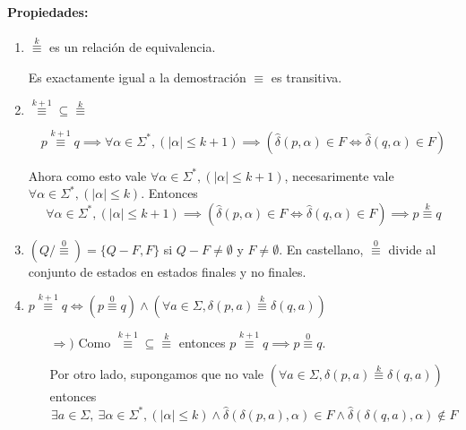 \paragraph{Propiedades:}
\begin{enumerate}
  \item \(\overset{k}{\equiv}\) es un relación de equivalencia.
        \begin{demo}[0.8\textwidth]
          Es exactamente igual a la demostración \(\equiv\) es transitiva.
        \end{demo}
  \item \(\overset{k+1}{\equiv}\subseteq\overset{k}{\equiv}\)
        \begin{demo}[0.8\textwidth]
          \[ p \overset{k+1}{\equiv} q \implies \forall \alpha\in\Sigma^*, (|\alpha|\leq k+1) \implies (\hat\delta(p,\alpha) \in F \iff \hat\delta(q,\alpha) \in F)\]

          Ahora como esto vale \(\forall \alpha\in\Sigma^*, (|\alpha|\leq k+1)\), necesarimente vale \(\forall \alpha\in\Sigma^*, (|\alpha|\leq k)\). Entonces
          \[ \forall \alpha\in\Sigma^*, (|\alpha|\leq k+1) \implies (\hat\delta(p,\alpha) \in F \iff \hat\delta(q,\alpha) \in F) \implies p \overset{k}{\equiv} q\]
        \end{demo}
  \item \(\left(Q / \overset{0}{\equiv}\right) = \{Q-F, F\}\) si \(Q - F \neq \emptyset\) y \(F \neq\emptyset\). En castellano, \(\overset{0}{\equiv}\) divide al conjunto de estados en estados finales y no finales.
  \item \(
        p\overset{k+1}{\equiv} q \iff \left(p \overset{0}{\equiv} q
        \right) \land \left(
        \forall a\in\Sigma, \delta(p,a) \overset{k}{\equiv} \delta(q,a)
        \right)
        \)
        \begin{demo}[0.8\textwidth]
          \begin{itemize}
            \item[\(\Rightarrow)\)] Como \(\overset{k+1}{\equiv} \subseteq \overset{k}{\equiv}\) entonces \( p\overset{k+1}{\equiv} q \implies p \overset{0}{\equiv} q\).

              Por otro lado, supongamos que no vale \(\left(
              \forall a\in\Sigma, \delta(p,a) \overset{k}{\equiv} \delta(q,a)
              \right)\) entonces
              \[
                \exists a\in\Sigma,~\exists\alpha\in\Sigma^*, (|\alpha|\leq k) \land \hat\delta(\delta(p,a), \alpha) \in F \land \hat\delta(\delta(q,a),\alpha) \notin F
              \]


\end{itemize}
\end{demo}
\end{enumerate}
